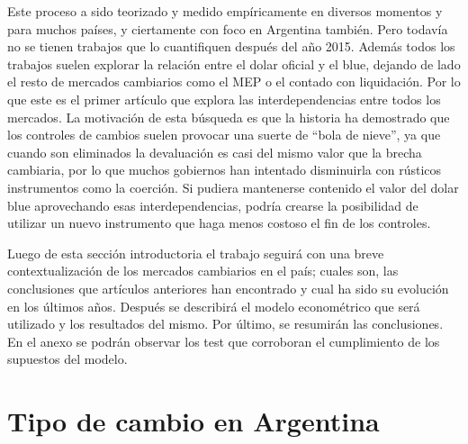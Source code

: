 \documentclass[11pt,a4paper]{article}
\begin{document}
Este proceso a sido teorizado y medido empíricamente en diversos momentos y para muchos países, y ciertamente con foco en Argentina también. Pero todavía no se tienen trabajos que lo cuantifiquen después del año 2015. Además todos los trabajos suelen explorar la relación entre el dolar oficial y el blue, dejando de lado el resto de mercados cambiarios como el MEP o el contado con liquidación. Por lo que este es el primer artículo que explora las interdependencias entre todos los mercados. La motivación de esta búsqueda es que la historia ha demostrado que los controles de cambios suelen provocar una suerte de ``bola de nieve'', ya que cuando son eliminados la devaluación es casi del mismo valor que la brecha cambiaria, por lo que muchos gobiernos han intentado disminuirla con rústicos instrumentos como la coerción. Si pudiera mantenerse contenido el valor del dolar blue aprovechando esas interdependencias, podría crearse la posibilidad de utilizar un nuevo instrumento que haga menos costoso el fin de los controles.

Luego de esta sección introductoria el trabajo seguirá con una breve contextualización de los mercados cambiarios en el país; cuales son, las conclusiones que artículos anteriores han encontrado y cual ha sido su evolución en los últimos años. Después se describirá el modelo econométrico que será utilizado y los resultados del mismo. Por último, se resumirán las conclusiones. En el anexo se podrán observar los test que corroboran el cumplimiento de los supuestos del modelo.


  
\section{Tipo de cambio en Argentina}
\end{document}
